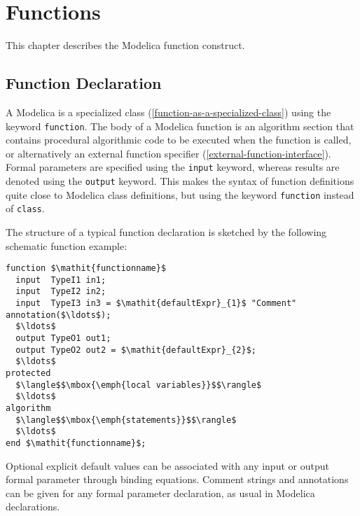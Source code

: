 \chapter{Functions}\label{functions}

This chapter describes the Modelica function construct.

\section{Function Declaration}\label{function-declaration}

A Modelica  is a specialized class (\cref{function-as-a-specialized-class}) using the keyword \lstinline!function!.
The body of a Modelica function is an algorithm section that contains procedural algorithmic code to be executed when the function is called, or alternatively an external function specifier (\cref{external-function-interface}).
Formal parameters are specified using the \lstinline!input! keyword, whereas results are denoted using the \lstinline!output! keyword.
This makes the syntax of function definitions quite close to Modelica class definitions, but using the keyword \lstinline!function! instead of \lstinline!class!.

\begin{nonnormative}
The structure of a typical function declaration is sketched by
the following schematic function example:
\begin{lstlisting}[language=modelica]
function $\mathit{functionname}$
  input  TypeI1 in1;
  input  TypeI2 in2;
  input  TypeI3 in3 = $\mathit{defaultExpr}_{1}$ "Comment" annotation($\ldots$);
  $\ldots$
  output TypeO1 out1;
  output TypeO2 out2 = $\mathit{defaultExpr}_{2}$;
  $\ldots$
protected
  $\langle$$\mbox{\emph{local variables}}$$\rangle$
  $\ldots$
algorithm
  $\langle$$\mbox{\emph{statements}}$$\rangle$
  $\ldots$
end $\mathit{functionname}$;
\end{lstlisting}
\end{nonnormative}

Optional explicit default values can be associated with any input or output formal parameter through binding equations.  Comment strings
and annotations can be given for any formal parameter declaration, as usual in Modelica declarations.

